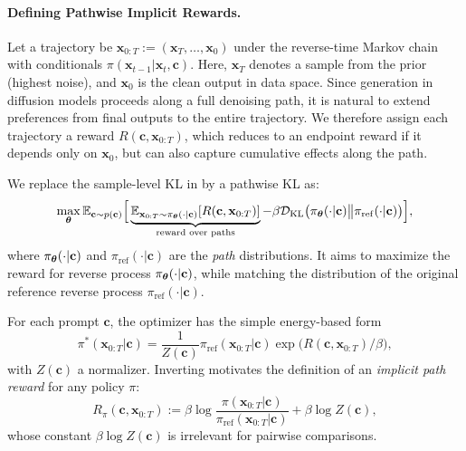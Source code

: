\paragraph{Defining Pathwise Implicit Rewards.}
Let a trajectory be $\mathbf x_{0:T}:=(\mathbf x_T,\ldots,\mathbf x_0)$ under the reverse-time Markov chain with conditionals $\pi(\mathbf x_{t-1}|\mathbf x_t,\mathbf c)$. Here, $\mathbf x_T$ denotes a sample from the prior (highest noise), and $\mathbf x_0$ is the clean output in data space. Since generation in diffusion models proceeds along a full denoising path, it is natural to extend preferences from final outputs to the entire trajectory. We therefore assign each trajectory a reward $R(\mathbf c,\mathbf x_{0:T})$, which reduces to an endpoint reward if it depends only on $\mathbf x_0$, but can also capture cumulative effects along the path. 

We replace the sample-level KL in  by a pathwise KL as:
\[
\max_{{\bm{\theta}}}\mathbb E_{\mathbf c\sim p(\mathbf c)}
\Big[
\underbrace{\mathbb E_{\mathbf x_{0:T}\sim \pi_{{\bm{\theta}}}(\cdot|\mathbf c)}[R(\mathbf c,\mathbf x_{0:T})]}_{\text{reward over paths}}
-\beta \mathcal D_{\mathrm{KL}} \big(\pi_{{\bm{\theta}}}(\cdot|\mathbf c) \big\| \pi_{\mathrm{ref}}(\cdot|\mathbf c)\big)
\Big],
\]
where $\pi_{{\bm{\theta}}}(\cdot|\mathbf c)$ and $\pi_{\mathrm{ref}}(\cdot|\mathbf c)$ are the \emph{path} distributions. It aims to maximize the reward for reverse process $\pi_{{\bm{\theta}}}(\cdot|\mathbf c)$, while matching the distribution of
the original reference reverse process $\pi_{\mathrm{ref}}(\cdot|\mathbf c)$.

For each prompt $\mathbf c$, the optimizer has the simple energy-based form
\begin{equation}\label{eq:path-closed-form}
\pi^*(\mathbf x_{0:T}|\mathbf c)
=\frac{1}{Z(\mathbf c)} \pi_{\mathrm{ref}}(\mathbf x_{0:T}|\mathbf c) 
\exp \big(R(\mathbf c,\mathbf x_{0:T})/\beta\big),
\end{equation}
with $Z(\mathbf c)$ a normalizer. Inverting  motivates the definition of an \emph{implicit path reward} for any policy $\pi$:
\[
R_{\pi}(\mathbf c,\mathbf x_{0:T})
:=\beta\log\frac{\pi(\mathbf x_{0:T}|\mathbf c)}{\pi_{\mathrm{ref}}(\mathbf x_{0:T}|\mathbf c)}+\beta\log Z(\mathbf c),
\]
whose constant $\beta\log Z(\mathbf c)$ is irrelevant for pairwise comparisons.

